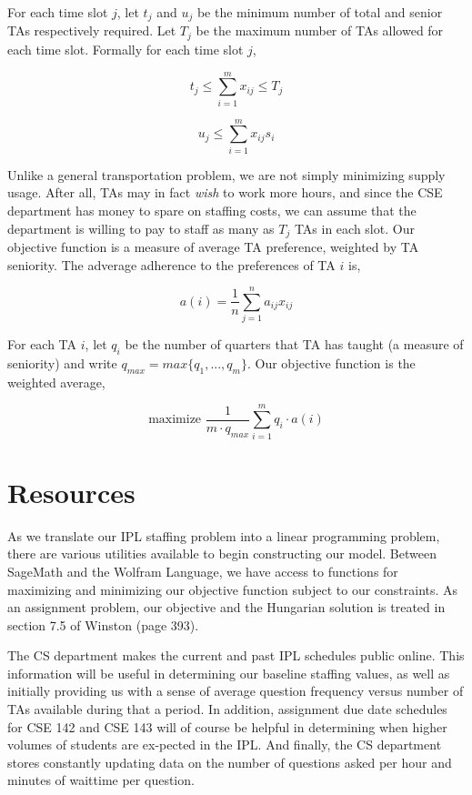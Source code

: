 \documentclass{article}
\begin{document}
\begin{multicols}{2}
For each time slot $j$, let $t_j$ and $u_j$ be the minimum number of total and senior TAs respectively required. Let $T_j$ be the maximum number of TAs allowed for each time slot. Formally for each time slot $j$,

\begin{equation}
t_j \leq \sum_{i=1}^{m}x_{ij} \leq T_j
\end{equation}

\begin{equation}
u_j \leq \sum_{i=1}^{m}x_{ij}s_i
\end{equation}

Unlike a general transportation problem, we are not simply minimizing supply usage. After all, TAs may in fact \textit{wish} to work more hours, and since the CSE department has money to spare on staffing costs, we can assume that the department is willing to pay to staff as many as $T_j$ TAs in each slot. Our objective function is a measure of average TA preference, weighted by TA seniority. The adverage adherence to the preferences of TA $i$ is,

\begin{equation}
a(i) = \frac{1}{n}\sum_{j=1}^na_{ij}x_{ij}
\end{equation}

For each TA $i$, let $q_i$ be the number of quarters that TA has taught (a measure of seniority) and write $q_{max} = max\{q_1, ..., q_m\}$. Our objective function is the weighted average,

\begin{equation}
\textrm{maximize } \frac{1}{m\cdot q_{max}} \sum_{i=1}^mq_i\cdot a(i)
\end{equation}

\section*{Resources}
As we translate our IPL staffing problem into a linear programming problem, there are various utilities available to begin constructing our model. Between SageMath and the Wolfram Language, we have access to functions for maximizing and minimizing our objective function subject to our constraints. As an assignment problem, our objective and the Hungarian solution is treated in section 7.5 of Winston (page 393).

The CS department makes the current and past IPL schedules public online. This information will be useful in determining our baseline staffing values, as well as initially providing us with a sense of average question frequency versus number of TAs available during that a period. In addition, assignment due date schedules for CSE 142 and CSE 143 will of course be helpful in determining when higher volumes of students are ex-pected in the IPL. And finally, the CS department stores constantly updating data on the number of questions asked per hour and minutes of waittime per question.


\end{multicols}
\end{document}
